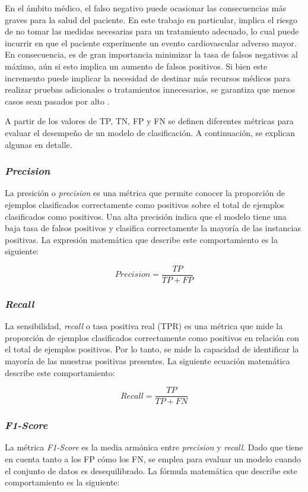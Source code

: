 En el ámbito médico, el falso negativo puede ocasionar las consecuencias más graves para la salud del 
paciente. En este trabajo en particular, implica el riesgo de no tomar las medidas necesarias para un 
tratamiento adecuado, lo cual puede incurrir en que el paciente experimente un evento cardiovascular 
adverso mayor. En consecuencia, es de gran importancia minimizar la tasa de falsos negativos al máximo, 
aún si esto implica un aumento de falsos positivos. Si bien este incremento puede implicar la necesidad de 
destinar más recursos médicos para realizar pruebas adicionales o tratamientos innecesarios, se garantiza 
que menos casos sean pasados por alto \citep{CITE:40}.

A partir de los valores de TP, TN, FP y FN se definen diferentes métricas para evaluar el desempeño de 
un modelo de clasificación. A continuación, se explican algunas en detalle.

\subsubsection{\emph{Precision}}
La presición o \emph{precision} es una métrica que permite conocer la proporción de ejemplos clasificados 
correctamente como positivos sobre el total de ejemplos clasificados como positivos. Una alta precisión 
indica que el modelo tiene una baja tasa de falsos positivos y clasifica correctamente la mayoría de las 
instancias positivas. La expresión matemática que describe este comportamiento es la siguiente:

\begin{equation}
	\label{eq:precision}
	Precision = \frac{TP}{TP + FP}
\end{equation}


\subsubsection{\emph{Recall}}
La sensibilidad, \emph{recall} o tasa positiva real (TPR) es una métrica que mide la proporción de ejemplos 
clasificados correctamente como positivos en relación con el total de ejemplos positivos. Por lo tanto, se 
mide la capacidad de identificar la mayoría de las muestras positivas presentes. La siguiente ecuación 
matemática describe este comportamiento:

\begin{equation}
	\label{eq:recall}
	Recall = \frac{TP}{TP + FN}
\end{equation}


\subsubsection{\emph{F1-Score}}
La métrica \emph{F1-Score} es la media armónica entre \emph{precision} y \emph{recall}. Dado que tiene 
en cuenta tanto a los FP cómo los FN, se emplea para evaluar un modelo cuando el conjunto de datos es 
desequilibrado. La fórmula matemática que describe este comportamiento es la siguiente:

